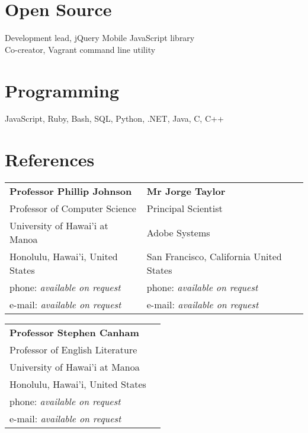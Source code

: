 \documentclass[margin,line]{resume}
\begin{document}
\begin{resume}
  \section{\mysidestyle Open Source}

  Development lead, jQuery Mobile JavaScript library
  \vspace{1mm}\\
  Co-creator, Vagrant command line utility
  \vspace{1mm}\\

  \section{\mysidestyle Programming}

  JavaScript, Ruby, Bash, SQL, Python, .NET, Java, C, C++


  \section{\mysidestyle References}

  \begin{tabular}{@{}p{6cm}p{6cm}}
    \textbf{Professor Phillip Johnson}      &  \textbf{Mr Jorge Taylor }                \\
    Professor of Computer Science           &  Principal Scientist                      \\
    University of Hawai'i at Manoa          &  Adobe Systems                            \\
    Honolulu, Hawai'i, United States        &  San Francisco, California United States  \\
    phone: \textsl{available on request}    &  phone: \textsl{available on request}     \\
    e-mail: \textsl{available on request}   &  e-mail: \textsl{available on request}    \\
  \end{tabular}

  \begin{tabular}{@{}p{6cm}p{6cm}}
    \textbf{Professor Stephen Canham}       \\
    Professor of English Literature         \\
    University of Hawai'i at Manoa          \\
    Honolulu, Hawai'i, United States        \\
    phone: \textsl{available on request}    \\
    e-mail: \textsl{available on request}   \\
  \end{tabular}

\end{resume}
\end{document}
